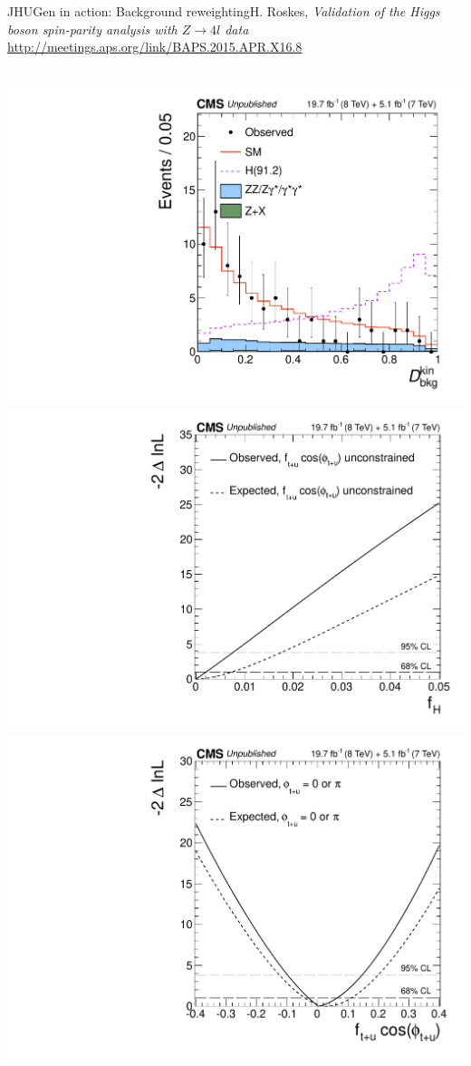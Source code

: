 \documentclass[usenames,dvipsnames,svgnames,table]{beamer}
\begin{document}
\begin{frame}{JHUGen in action: Background reweighting}{H. Roskes, \emph{Validation of the Higgs boson spin-parity
analysis with $Z\to 4l$ data}\\ \url{http://meetings.aps.org/link/BAPS.2015.APR.X16.8}}
\begin{columns}
\begin{column}{0.55\textwidth}
\includegraphics[width=.5\columnwidth]{HVV/Z4lDbkgkin}
\includegraphics[width=.5\columnwidth]{HVV/Z4lfHscan} \\
\newlength{\imageheight}
\settoheight{}
\hfuzz=24pt
\includegraphics[width=.5\columnwidth]{HVV/Z4lftuscan}

\end{column}
\end{columns}
\end{frame}
\end{document}
